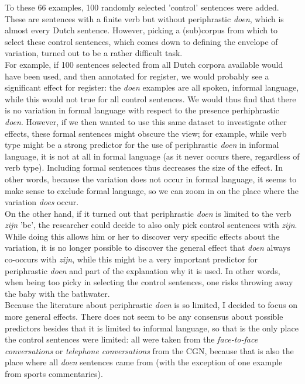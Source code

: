 \documentclass[12pt]{article}
\begin{document}
To these 66 examples, 100 randomly selected 'control' sentences were added. These are sentences with a finite verb but without periphrastic \emph{doen}, which is almost every Dutch sentence. However, picking a (sub)corpus from which to select these control sentences, which comes down to defining the envelope of variation, turned out to be a rather difficult task. \\\indent
For example, if 100 sentences selected from all Dutch corpora available would have been used, and then annotated for register, we would probably see a significant effect for register: the \emph{doen} examples are all spoken, informal language, while this would not true for all control sentences. We would thus find that there is no variation in formal language with respect to the presence perhiphrastic \emph{doen}. However, if we then wanted to use this same dataset to investigate other effects, these formal sentences might obscure the view; for example, while verb type might be a strong predictor for the use of periphrastic \emph{doen} in informal language, it is not at all in formal language (as it never occurs there, regardless of verb type). Including formal sentences thus decreases the size of the effect. In other words, because the variation does not occur in formal language, it seems to make sense to exclude formal language, so we can zoom in on the place where the variation \emph{does} occur. \\\indent 
On the other hand, if it turned out that periphrastic \emph{doen} is limited to the verb \emph{zijn} 'be', the researcher could decide to also only pick control sentences with \emph{zijn}. While doing this allows him or her to discover very specific effects about the variation, it is no longer possible to discover the general effect that \emph{doen} always co-occurs with \emph{zijn}, while this might be a very important predictor for periphrastic \emph{doen} and part of the explanation why it is used. In other words, when being too picky in selecting the control sentences, one risks throwing away the baby with the bathwater.\\\indent
Because the literature about periphrastic \emph{doen} is so limited, I decided to focus on more general effects. There does not seem to be any consensus about possible predictors besides that it is limited to informal language, so that is the only place the control sentences were limited: all were taken from the \emph{face-to-face conversations} or \emph{telephone conversations} from the CGN, because that is also the place where all \emph{doen} sentences came from (with the exception of one example from sports commentaries).
\end{document}
